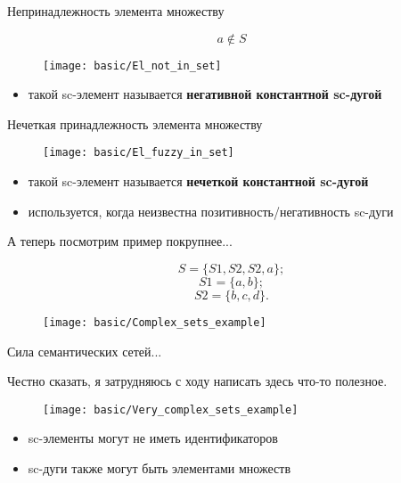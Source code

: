 \begin{frame}{Непринадлежность элемента множеству}
  \begin{center}
    \[ a \notin S \]

    \objeqv  

    \begin{figure}
      \texttt{[image: basic/El\_not\_in\_set]}
    \end{figure}
  \end{center}

  \begin{itemize}
  \item такой sc-элемент называется \textbf{негативной константной sc-дугой}
  \end{itemize}
\end{frame}

\begin{frame}{Нечеткая принадлежность элемента множеству}
  \begin{figure}
    \centering
    \texttt{[image: basic/El\_fuzzy\_in\_set]}
  \end{figure}

  \begin{itemize}
  \item такой sc-элемент называется \textbf{нечеткой константной sc-дугой}
  \item используется, когда неизвестна позитивность/негативность sc-дуги
  \end{itemize}
\end{frame}

\begin{frame}{А теперь посмотрим пример покрупнее...}
  \begin{center}
    \[ S = \{S1, S2, S2, a\}; \]
    \[ S1 = \{a, b\}; \]
    \[ S2 = \{b, c, d\}. \]
  \end{center}

  \objeqv

  \begin{figure}
    \texttt{[image: basic/Complex\_sets\_example]}
  \end{figure}
\end{frame}

\begin{frame}{Сила семантических сетей...}
  \begin{center}
    Честно сказать, я затрудняюсь с ходу написать здесь что-то
    полезное.
  \end{center}

  \objeqv  

  \begin{figure}
    \centering
    \texttt{[image: basic/Very\_complex\_sets\_example]}
  \end{figure}

  \begin{itemize}
  \item sc-элементы могут не иметь идентификаторов
  \item sc-дуги также могут быть элементами множеств
  \end{itemize}
\end{frame}

